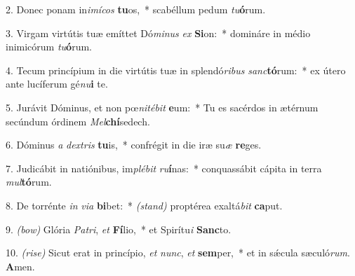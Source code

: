 2. Donec ponam in\textit{i}\textit{mí}\textit{cos} \textbf{tu}os,~* 
	scabéllum pedum \textit{tu}\textbf{ó}rum.

3. Virgam virtútis tuæ emíttet Dó\textit{mi}\textit{nus} \textit{ex} \textbf{Si}on:~* 
	domináre in médio inimicórum \textit{tu}\textbf{ó}rum.

4. Tecum princípium in die virtútis tuæ in splendó\textit{ri}\textit{bus} \textit{sanc}\textbf{tó}rum:~* 
	ex útero ante lucíferum gé\textit{nu}\textbf{i} te.

5. Jurávit Dóminus, et non pœ\textit{ni}\textit{té}\textit{bit} \textbf{e}um:~* 
	Tu es sacérdos in ætérnum secúndum órdinem \textit{Mel}\textbf{chí}sedech.

6. Dóminus \textit{a} \textit{dex}\textit{tris} \textbf{tu}is,~* 
	confrégit in die iræ su\textit{æ} \textbf{re}ges.

7. Judicábit in natiónibus, im\textit{plé}\textit{bit} \textit{ru}\textbf{í}nas:~* 
	conquassábit cápita in terra \textit{mul}\textbf{tó}rum.

8. De torrénte \textit{in} \textit{vi}\textit{a} \textbf{bi}bet:~* {\color{red}\textit{(stand)}}
	proptérea exaltá\textit{bit} \textbf{ca}put.

9.  {\color{red}\textit{(bow)}} Glória \textit{Pa}\textit{tri}, \textit{et} \textbf{Fí}lio,~* 
	et Spirítu\textit{i} \textbf{Sanc}to.

10.  {\color{red}\textit{(rise)}} Sicut erat in princípio, \textit{et} \textit{nunc}, \textit{et} \textbf{sem}per,~* 
	et in s\'{\ae}cula sæculó\textit{rum}. \textbf{A}men.